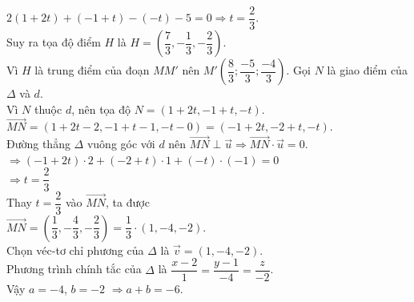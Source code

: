 \begin{ex}
{\begin{itemchoice}
			 $2(1+2t)+(-1+t)-(-t)-5=0 \Rightarrow t=\dfrac{2}{3}$.\\
			Suy ra tọa độ  điểm $H$ là
			 $H=\left(\dfrac{7}{3},-\dfrac{1}{3},-\dfrac{2}{3}\right)$.\\
			Vì $H$ là trung điểm của đoạn $MM'$ nên $M'\left( \dfrac{8}{3};\dfrac{-5}{3};\dfrac{-4}{3}\right) $. 
			\itemch Gọi $N$ là giao điểm  của $\Delta$ và $d$. \\
			Vì  $N$ thuộc $d$, nên tọa độ $N=(1+2t,-1+t,-t)$.\\
			 $\overrightarrow{MN}=(1+2t-2,-1+t-1,-t-0)=(-1+2t,-2+t,-t)$.\\
			 Đường thẳng $\Delta$ vuông góc với $d$ nên $\overrightarrow{MN} \perp \overrightarrow{u}\Rightarrow \overrightarrow{MN} \cdot \overrightarrow{u}=0$.\\
			$\Rightarrow(-1+2t)\cdot 2+(-2+t)\cdot 1+(-t)\cdot (-1)=0$  \\
			$\Rightarrow  t=\dfrac{2}{3}$\\
			Thay $t=\dfrac{2}{3}$ vào $\overrightarrow{MN}$,  ta được\\
			$\overrightarrow{MN}=\left(\dfrac{1}{3},-\dfrac{4}{3},-\dfrac{2}{3}\right)=\dfrac{1}{3}\cdot(1,-4,-2)$.\\ 
			Chọn véc-tơ chỉ phương của $\Delta$  là $\overrightarrow{v}=(1,-4,-2)$.\\
			Phương trình chính tắc của  $\Delta$ là
			 $\dfrac{x-2}{1}=\dfrac{y-1}{-4}=\dfrac{z}{-2}$.\\
			Vậy $a=-4$, $b=-2$  $\Rightarrow a+b=-6$.
		\end{itemchoice}
	 }
\end{ex}


